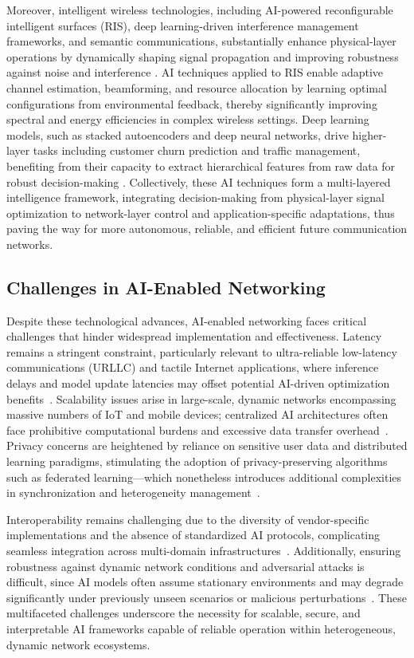 \documentclass[sigconf]{acmart}
\begin{document}
Moreover, intelligent wireless technologies, including AI-powered reconfigurable intelligent surfaces (RIS), deep learning-driven interference management frameworks, and semantic communications, substantially enhance physical-layer operations by dynamically shaping signal propagation and improving robustness against noise and interference \cite{ref16,ref49,ref50}. AI techniques applied to RIS enable adaptive channel estimation, beamforming, and resource allocation by learning optimal configurations from environmental feedback, thereby significantly improving spectral and energy efficiencies in complex wireless settings. Deep learning models, such as stacked autoencoders and deep neural networks, drive higher-layer tasks including customer churn prediction and traffic management, benefiting from their capacity to extract hierarchical features from raw data for robust decision-making \cite{ref16}. Collectively, these AI techniques form a multi-layered intelligence framework, integrating decision-making from physical-layer signal optimization to network-layer control and application-specific adaptations, thus paving the way for more autonomous, reliable, and efficient future communication networks.

\subsection{Challenges in AI-Enabled Networking}

Despite these technological advances, AI-enabled networking faces critical challenges that hinder widespread implementation and effectiveness. Latency remains a stringent constraint, particularly relevant to ultra-reliable low-latency communications (URLLC) and tactile Internet applications, where inference delays and model update latencies may offset potential AI-driven optimization benefits~\cite{ref26,ref27}. Scalability issues arise in large-scale, dynamic networks encompassing massive numbers of IoT and mobile devices; centralized AI architectures often face prohibitive computational burdens and excessive data transfer overhead~\cite{ref28,ref52}. Privacy concerns are heightened by reliance on sensitive user data and distributed learning paradigms, stimulating the adoption of privacy-preserving algorithms such as federated learning—which nonetheless introduces additional complexities in synchronization and heterogeneity management~\cite{ref29,ref52}. 

Interoperability remains challenging due to the diversity of vendor-specific implementations and the absence of standardized AI protocols, complicating seamless integration across multi-domain infrastructures~\cite{ref30,ref48}. Additionally, ensuring robustness against dynamic network conditions and adversarial attacks is difficult, since AI models often assume stationary environments and may degrade significantly under previously unseen scenarios or malicious perturbations~\cite{ref49,ref50,ref53}. These multifaceted challenges underscore the necessity for scalable, secure, and interpretable AI frameworks capable of reliable operation within heterogeneous, dynamic network ecosystems.
\end{document}
